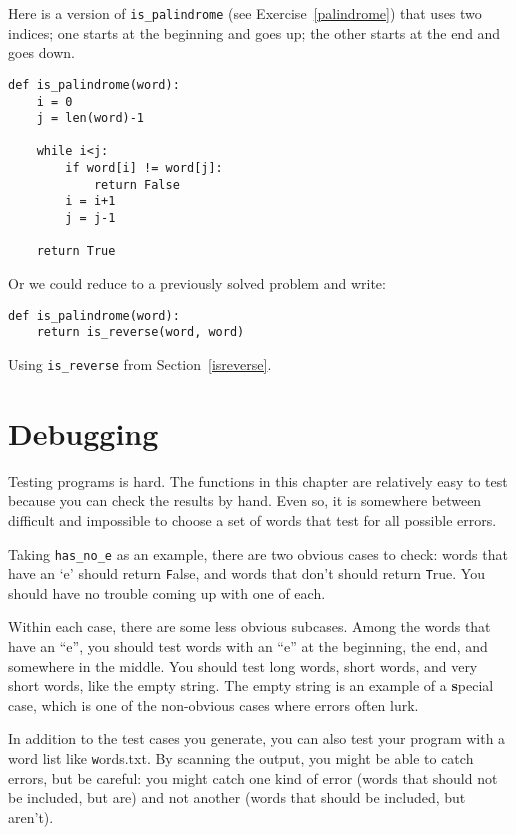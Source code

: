 \documentclass[
DIV=11,
fontsize=13,
twoside,
headinclude=false,
titlepage=firstiscover,
abstract=true,
headsepline=true,
footsepline=true,
chapterprefix=true, %
headings=big,
bibliography=totoc,%
captions=tableheading
]{scrbook}
\theoremstyle{definition}
\begin{document}
Here is a version of \verb"is_palindrome" (see
Exercise~\ref{palindrome}) that uses two indices; one starts at the
beginning and goes up; the other starts at the end and goes down.

\begin{lstlisting}
def is_palindrome(word):
    i = 0
    j = len(word)-1

    while i<j:
        if word[i] != word[j]:
            return False
        i = i+1
        j = j-1

    return True
\end{lstlisting}

Or we could reduce to a previously solved
problem and write:

\begin{lstlisting}
def is_palindrome(word):
    return is_reverse(word, word)
\end{lstlisting}
%
Using \verb"is_reverse" from Section~\ref{isreverse}.


\section{Debugging}

Testing programs is hard.  The functions in this chapter are
relatively easy to test because you can check the results by hand.
Even so, it is somewhere between difficult and impossible to choose a
set of words that test for all possible errors.

Taking \verb"has_no_e" as an example, there are two obvious
cases to check: words that have an `e' should return {\texttt False}, and
words that don't should return {\texttt True}.  You should have no
trouble coming up with one of each.

Within each case, there are some less obvious subcases.  Among the
words that have an ``e'', you should test words with an ``e'' at the
beginning, the end, and somewhere in the middle.  You should test long
words, short words, and very short words, like the empty string.  The
empty string is an example of a {\textbf special case}, which is one of
the non-obvious cases where errors often lurk.

In addition to the test cases you generate, you can also test
your program with a word list like {\texttt words.txt}.  By scanning
the output, you might be able to catch errors, but be careful:
you might catch one kind of error (words that should not be
included, but are) and not another (words that should be included,
but aren't).
\end{document}
